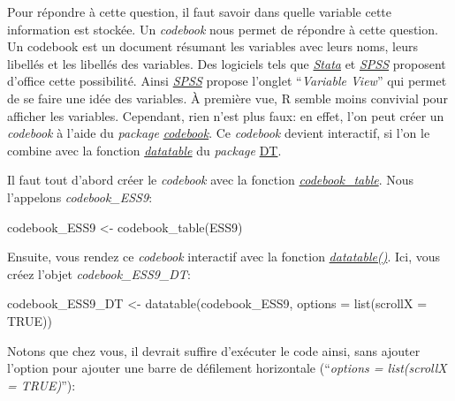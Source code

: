 \documentclass[
]{book}
\newenvironment{Shaded}{\begin{snugshade}}{\end{snugshade}}
\newcommand{\AttributeTok}[1]{\textcolor[rgb]{0.77,0.63,0.00}{#1}}
\newcommand{\ConstantTok}[1]{\textcolor[rgb]{0.00,0.00,0.00}{#1}}
\newcommand{\FunctionTok}[1]{\textcolor[rgb]{0.00,0.00,0.00}{#1}}
\newcommand{\NormalTok}[1]{#1}
\newcommand{\OtherTok}[1]{\textcolor[rgb]{0.56,0.35,0.01}{#1}}
\begin{document}
Pour répondre à cette question, il faut savoir dans quelle variable cette information est stockée. Un \emph{codebook} nous permet de répondre à cette question. Un codebook est un document résumant les variables avec leurs noms, leurs libellés et les libellés des variables. Des logiciels tels que \href{https://www.stata.com/}{\emph{Stata}} et \href{https://www.ibm.com/fr-fr/products/spss-statistics}{\emph{SPSS}} proposent d'office cette possibilité. Ainsi \href{https://www.ibm.com/fr-fr/products/spss-statistics}{\emph{SPSS}} propose l'onglet ``\emph{Variable View}'' qui permet de se faire une idée des variables. À première vue, R semble moins convivial pour afficher les variables. Cependant, rien n'est plus faux: en effet, l'on peut créer un \emph{codebook} à l'aide du \emph{package} \href{https://rubenarslan.github.io/codebook/index.html}{\emph{codebook}}. Ce \emph{codebook} devient interactif, si l'on le combine avec la fonction \href{https://www.rdocumentation.org/packages/DT/versions/0.26/topics/datatable}{\emph{datatable}} du \emph{package} \href{https://rstudio.github.io/DT/}{DT}.

Il faut tout d'abord créer le \emph{codebook} avec la fonction \href{https://www.rdocumentation.org/packages/codebook/versions/0.9.2/topics/codebook_table}{\emph{codebook\_table}}. Nous l'appelons \emph{codebook\_ESS9}:

\begin{Shaded}
\begin{Highlighting}[]
\NormalTok{codebook\_ESS9 }\OtherTok{\textless{}{-}} \FunctionTok{codebook\_table}\NormalTok{(ESS9)}
\end{Highlighting}
\end{Shaded}

Ensuite, vous rendez ce \emph{codebook} interactif avec la fonction \href{https://www.rdocumentation.org/packages/DT/versions/0.26/topics/datatable}{\emph{datatable()}}. Ici, vous créez l'objet \emph{codebook\_ESS9\_DT}:

\begin{Shaded}
\begin{Highlighting}[]
\NormalTok{codebook\_ESS9\_DT }\OtherTok{\textless{}{-}} \FunctionTok{datatable}\NormalTok{(codebook\_ESS9, }\AttributeTok{options =} \FunctionTok{list}\NormalTok{(}\AttributeTok{scrollX =} \ConstantTok{TRUE}\NormalTok{))}
\end{Highlighting}
\end{Shaded}

Notons que chez vous, il devrait suffire d'exécuter le code ainsi, sans ajouter l'option pour ajouter une barre de défilement horizontale (``\emph{options = list(scrollX = TRUE)}''):
\end{document}

